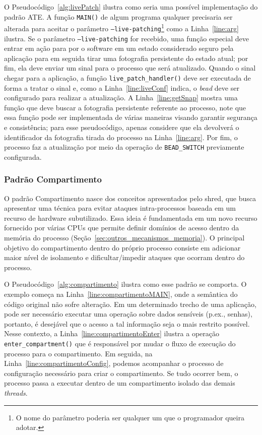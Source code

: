 O Pseudocódigo~\ref{alg:livePatch} ilustra como seria uma possível
implementação do padrão ATE. A função \texttt{MAIN()} de algum programa
qualquer precisaria ser alterada para aceitar o parâmetro
\texttt{--live-patching}\footnote{O nome do parâmetro poderia ser qualquer um
que o programador queira adotar.} como a Linha~\ref{line:arg} ilustra. Se o
parâmetro \texttt{--live-patching} for recebido, uma função especial deve entrar em ação para por o
software em um estado considerado seguro pela aplicação para em seguida tirar
uma fotografia persistente do estado atual; por fim, ela deve enviar um sinal
para o processo que será atualizado. Quando o sinal chegar para a aplicação,
a função \texttt{live\_patch\_handler()} deve ser executada de forma a
tratar o sinal e, como a Linha~\ref{line:liveConf} indica, o \emph{bead} deve ser
configurado para realizar a atualização. A Linha~\ref{line:getSnap} mostra uma
função que deve buscar a fotografia persistente referente ao processo, note que
essa função pode ser implementada de várias maneiras visando garantir segurança
e consistência; para esse pseudocódigo, apenas considere que ela devolverá o
identificador da fotografia tirada do processo na Linha~\ref{line:arg}. Por
fim, o processo faz a atualização por meio da operação de \texttt{BEAD\_SWITCH}
previamente configurada.

\subsubsection{Padrão Compartimento}

O padrão Compartimento nasce dos conceitos apresentados pelo shred, que busca apresentar uma técnica para evitar ataques intra-processos
baseada em um recurso de hardware subutilizado. Essa ideia é fundamentada em um
novo recurso fornecido por várias CPUs que permite definir domínios de acesso
dentro da memória do processo (Seção~\ref{sec:outros_mecanismos_memoria}). O
principal objetivo do compartimento dentro do próprio processo consiste em
adicionar maior nível de isolamento e dificultar/impedir ataques que ocorram
dentro do processo.



O Pseudocódigo~\ref{alg:compartimento} ilustra como esse padrão se comporta. O
exemplo começa na Linha~\ref{line:compartimentoMAIN}, onde a semântica do
código original não sofre alteração. Em um determinado trecho de uma aplicação,
pode ser necessário executar uma operação sobre dados sensíveis (p.ex., senhas),
portanto, é desejável que o acesso a tal informação seja o mais restrito
possível. Nesse contexto, a Linha~\ref{line:compartimentoEnter} ilustra a
operação \texttt{enter\_compartment()} que é responsável por mudar o fluxo de
execução do processo para o compartimento. Em seguida, na
Linha~\ref{line:compartimentoConfig}, podemos acompanhar o processo de
configuração necessário para criar o compartimento. Se tudo ocorrer bem, o processo passa a executar dentro de
um compartimento isolado das demais \emph{threads}. 

